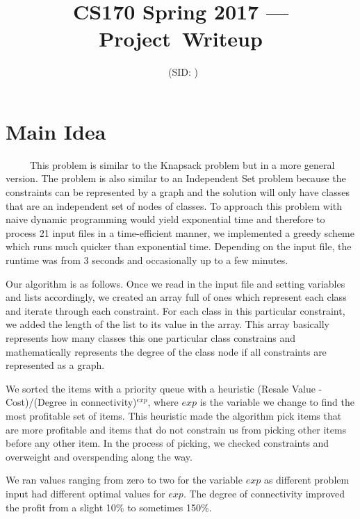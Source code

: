 \documentclass[11pt]{article}
\title{CS170 Spring 2017 --- Project\ Writeup}
\author{\Name \ (SID: \SID)}
\date{}
\begin{document}
\maketitle

\section*{Main Idea}

\ \ \ \ \ This problem is similar to the Knapsack problem but in a more general version. The problem is also similar to an Independent Set problem because the constraints can be represented by a graph and the solution will only have classes that are an independent set of nodes of classes. To approach this problem with naive dynamic programming would yield exponential time and therefore to process 21 input files in a time-efficient manner, we implemented a greedy scheme which runs much quicker than exponential time. Depending on the input file, the runtime was from 3 seconds and occasionally up to a few minutes.

Our algorithm is as follows. Once we read in the input file and setting variables and lists accordingly, we created an array full of ones which represent each class and iterate through each constraint. For each class in this particular constraint, we added the length of the list to its value in the array. This array basically represents how many classes this one particular class constrains and mathematically represents the degree of the class node if all constraints are represented as a graph.

We sorted the items with a priority queue with a heuristic (Resale Value - Cost)/(Degree in connectivity)$^{exp}$, where $exp$ is the variable we change to find the most profitable set of items. This heuristic made the algorithm pick items that are more profitable and items that do not constrain us from picking other items before any other item. In the process of picking, we checked constraints and overweight and overspending along the way.

We ran values ranging from zero to two for the variable $exp$ as different problem input had different optimal values for $exp$. The degree of connectivity improved the profit from a slight 10\% to sometimes 150\%.
\end{document}
